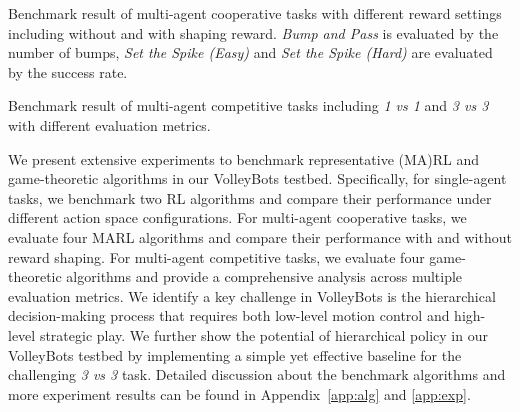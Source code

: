 \begin{table*}[t]
    \centering
    
    \caption{Benchmark result of multi-agent cooperative tasks with different reward settings including without and with shaping reward. \textit{Bump and Pass} is evaluated by the number of bumps, \textit{Set the Spike (Easy)} and \textit{Set the Spike (Hard)} are evaluated by the success rate.}
    \label{tab:coop}
\end{table*}

\begin{table*}[t]
    \centering
    
    \caption{Benchmark result of multi-agent competitive tasks including \textit{1 vs 1} and \textit{3 vs 3} with different evaluation metrics.}
    \label{tab:comp}
\end{table*}

We present extensive experiments to benchmark representative (MA)RL and game-theoretic algorithms in our VolleyBots testbed.
Specifically, for single-agent tasks, we benchmark two RL algorithms and compare their performance under different action space configurations. For multi-agent cooperative tasks, we evaluate four MARL algorithms and compare their performance with and without reward shaping. For multi-agent competitive tasks, we evaluate four game-theoretic algorithms and provide a comprehensive analysis across multiple evaluation metrics. We identify a key challenge in VolleyBots is the hierarchical decision-making process that requires both low-level motion control and high-level strategic play. We further show the potential of hierarchical policy in our VolleyBots testbed by implementing a simple yet effective baseline for the challenging \textit{3 vs 3} task.
Detailed discussion about the benchmark algorithms and more experiment results can be found in Appendix~\ref{app:alg} and \ref{app:exp}.


